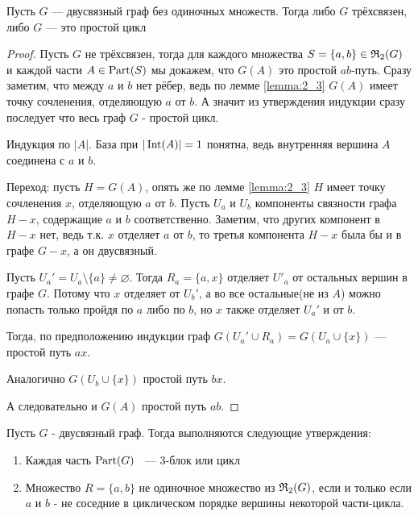 \begin{thm}[Теорема 2.1] \label{theorem:2_1}
	Пусть $G$ — двусвязный граф без одиночных множеств.
	Тогда либо $G$ трёхсвязен, либо $G$ — это простой цикл
\end{thm}

\begin{proof}
	Пусть $G$ не трёхсвязен, тогда для каждого множества $S = \{a, b \} \in \mathfrak{R}_2(G)$ и каждой части $A \in \operatorname{Part}(S)$ мы докажем, что $G(A)$ это простой $ab$-путь.
	Сразу заметим, что между $a$ и $b$ нет рёбер, ведь по лемме \ref{lemma:2_3} $G(A)$ имеет точку сочленения, отделяющую $a$ от $b$.
	А значит из утверждения индукции сразу последует что весь граф $G$ - простой цикл.

	Индукция по $|A|$.
	База при $|\operatorname{Int}(A)| = 1$ понятна, ведь внутренняя вершина $A$ соединена с $a$ и $b$.

	Переход: пусть $H = G(A)$, опять же по лемме \ref{lemma:2_3} $H$ имеет точку сочленения $x$, отделяющую $a$ от $b$.
	Пусть $U_a$ и $U_b$ компоненты связности графа $H - x$, содержащие $a$ и $b$ соответственно.
	Заметим, что других компонент в $H - x$ нет, ведь т.к. $x$ отделяет $a$ от $b$, то третья компонента $H - x$ была бы и в графе $G - x$, а он двусвязный.

	Пусть $U_a' = U_a \setminus \{a\} \neq \varnothing$.
	Тогда $R_a = \{a, x \}$ отделяет $U'_a$ от остальных вершин в графе $G$.
	Потому что $x$ отделяет от $U_b'$, а во все остальные(не из $A$) можно попасть только пройдя по $a$ либо по $b$, но $x$ также отделяет $U_a'$ и от $b$.

	Тогда, по предположению индукции граф $G(U_a' \cup R_a) = G(U_a \cup \{x\})$ — простой путь $ax$.

	Аналогично $G(U_b \cup \{x\})$ простой путь $bx$.

	А следовательно и $G(A)$ простой путь $ab$.
\end{proof}

\begin{thm}[Теорема 2.2] \label{theorem:2_2}
	Пусть $G$ - двусвязный граф.
	Тогда выполняются следующие утверждения:

	\begin{enumerate}
		\item Каждая часть $\operatorname{Part}(G)$ ~--- 3-блок или цикл
		\item Множество $R = \{a, b\}$ не одиночное множество из $\mathfrak{R}_2(G)$, если и только если $a$ и $b$ - не соседние в циклическом порядке вершины некоторой части-цикла.
	\end{enumerate}

\end{thm}

